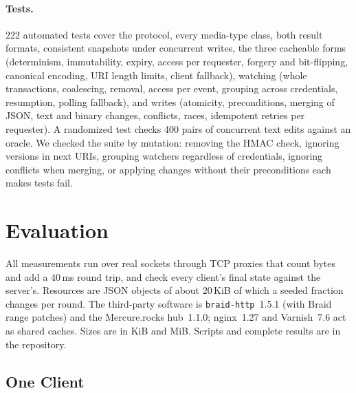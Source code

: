\documentclass[11pt,a4paper]{article}
\begin{document}
\paragraph{Tests.}
222 automated tests cover the protocol, every media-type class, both result formats, consistent snapshots under concurrent writes, the three cacheable forms (determinism, immutability, expiry, access per requester, forgery and bit-flipping, canonical encoding, URI length limits, client fallback), watching (whole transactions, coalescing, removal, access per event, grouping across credentials, resumption, polling fallback), and writes (atomicity, preconditions, merging of JSON, text and binary changes, conflicts, races, idempotent retries per requester). A randomized test checks 400 pairs of concurrent text edits against an oracle. We checked the suite by mutation: removing the HMAC check, ignoring versions in next URIs, grouping watchers regardless of credentials, ignoring conflicts when merging, or applying changes without their preconditions each makes tests fail.

\section{Evaluation}
\label{sec:eval}

All measurements run over real sockets through TCP proxies that count bytes and add a 40\,ms round trip, and check every client's final state against the server's. Resources are JSON objects of about 20\,KiB of which a seeded fraction changes per round. The third-party software is \texttt{braid-http}~1.5.1 (with Braid range patches) and the Mercure.rocks hub~1.1.0; nginx~1.27 and Varnish~7.6 act as shared caches. Sizes are in KiB and MiB. Scripts and complete results are in the repository.

\subsection{One Client}
\end{document}
